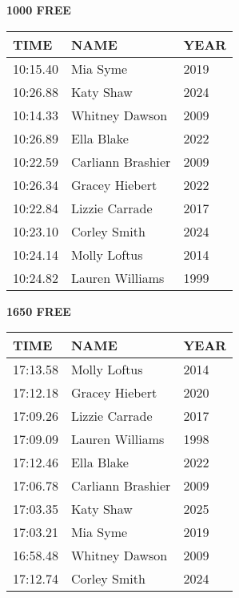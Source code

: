 \begin{minipage}[t]{0.48\textwidth}
\centering
\textbf{1000 FREE}\\[0.05cm]
\begin{tabular}{@{}p{1.8cm}p{2.8cm}p{1.2cm}@{}}
\hline
\textbf{TIME} & \textbf{NAME} & \textbf{YEAR} \\
\hline
10:15.40 & Mia Syme & 2019 \\
10:26.88 & Katy Shaw & 2024 \\
10:14.33 & Whitney Dawson & 2009 \\
10:26.89 & Ella Blake & 2022 \\
10:22.59 & Carliann Brashier & 2009 \\
10:26.34 & Gracey Hiebert & 2022 \\
10:22.84 & Lizzie Carrade & 2017 \\
10:23.10 & Corley Smith & 2024 \\
10:24.14 & Molly Loftus & 2014 \\
10:24.82 & Lauren Williams & 1999 \\
\hline
\end{tabular}
\end{minipage}\hfill
\begin{minipage}[t]{0.48\textwidth}
\centering
\textbf{1650 FREE}\\[0.05cm]
\begin{tabular}{@{}p{1.8cm}p{2.8cm}p{1.2cm}@{}}
\hline
\textbf{TIME} & \textbf{NAME} & \textbf{YEAR} \\
\hline
17:13.58 & Molly Loftus & 2014 \\
17:12.18 & Gracey Hiebert & 2020 \\
17:09.26 & Lizzie Carrade & 2017 \\
17:09.09 & Lauren Williams & 1998 \\
17:12.46 & Ella Blake & 2022 \\
17:06.78 & Carliann Brashier & 2009 \\
17:03.35 & Katy Shaw & 2025 \\
17:03.21 & Mia Syme & 2019 \\
16:58.48 & Whitney Dawson & 2009 \\
17:12.74 & Corley Smith & 2024 \\
\hline
\end{tabular}
\end{minipage}

\vspace{0.4cm}

